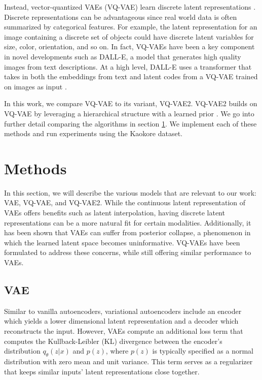 \documentclass{article}
\begin{document}
Instead, vector-quantized VAEs (VQ-VAE) learn discrete latent representations \cite{VQ_VAE}. Discrete representations can be advantageous since real world data is often summarized by categorical features. For example, the latent representation for an image containing a discrete set of objects could have discrete latent variables for size, color, orientation, and so on. In fact, VQ-VAEs have been a key component in novel developments such as DALL-E, a model that generates high quality images from text descriptions. At a high level, DALL-E uses a transformer that takes in both the embeddings from text and latent codes from a VQ-VAE trained on images as input \cite{DALLE}.

In this work, we compare VQ-VAE to its variant, VQ-VAE2. VQ-VAE2 builds on VQ-VAE by leveraging a hierarchical structure with a learned prior \cite{VQ_VAE2}. We go into further detail comparing the algorithms in section \ref{methods}. We implement each of these methods and run experiments using the Kaokore dataset. 

\section{Methods} \label{methods}
In this section, we will describe the various models that are relevant to our work: VAE, VQ-VAE, and VQ-VAE2. While the continuous latent representation of VAEs offers benefits such as latent interpolation, having discrete latent representations can be a more natural fit for certain modalities. Additionally, it has been shown that VAEs can suffer from posterior collapse, a phenomenon in which the learned latent space becomes uninformative. VQ-VAEs have been formulated to address these concerns, while still offering similar performance to VAEs. 

\subsection{VAE}
Similar to vanilla autoencoders, variational autoencoders include an encoder which yields a lower dimensional latent representation and a decoder which reconstructs the input. However, VAEs compute an additional loss term that computes the Kullback-Leibler (KL) divergence between the encoder’s distribution \(q_{\theta}(z|x)\) and \(p(z)\), where \(p(z)\) is typically specified as a normal distribution with zero mean and unit variance. This term serves as a regularizer that keeps similar inputs’ latent representations close together.
\end{document}
